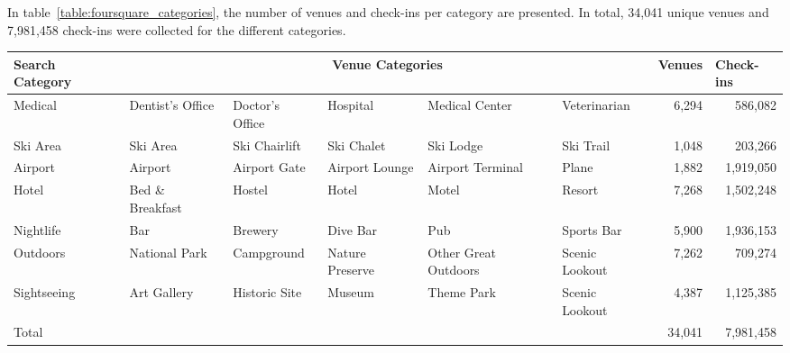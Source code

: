 In table~\ref{table:foursquare_categories}, the number of venues and check-ins per category are presented. In total, 34,041 unique venues and 7,981,458 check-ins were collected for the different categories.


\begin{sidewaystable}[]
\centering
\caption{foursquare venue categories}
\label{table:foursquare_categories}

\centering %

\begin{tabular}{lrrrrrrr}
\toprule
Search Category & \multicolumn{5}{c}{Venue Categories}  & \multicolumn{1}{l}{Venues} & \multicolumn{1}{l}{Check-ins} \\
\midrule
Medical & \multicolumn{1}{l}{Dentist's Office} & \multicolumn{1}{l}{Doctor's Office} & \multicolumn{1}{l}{Hospital} & \multicolumn{1}{l}{Medical Center} & \multicolumn{1}{l}{Veterinarian} &          6,294  &              586,082  \\
Ski Area & \multicolumn{1}{l}{Ski Area} & \multicolumn{1}{l}{Ski Chairlift} & \multicolumn{1}{l}{Ski Chalet} & \multicolumn{1}{l}{Ski Lodge} & \multicolumn{1}{l}{Ski Trail} &          1,048  &              203,266  \\
Airport & \multicolumn{1}{l}{Airport} & \multicolumn{1}{l}{Airport Gate} & \multicolumn{1}{l}{Airport Lounge} & \multicolumn{1}{l}{Airport Terminal} & \multicolumn{1}{l}{Plane} &          1,882  &          1,919,050  \\
Hotel & \multicolumn{1}{l}{Bed \& Breakfast} & \multicolumn{1}{l}{Hostel} & \multicolumn{1}{l}{Hotel} & \multicolumn{1}{l}{Motel} & \multicolumn{1}{l}{Resort} &          7,268  &          1,502,248  \\
Nightlife & \multicolumn{1}{l}{Bar} & \multicolumn{1}{l}{Brewery} & \multicolumn{1}{l}{Dive Bar} & \multicolumn{1}{l}{Pub} & \multicolumn{1}{l}{Sports Bar} &          5,900  &          1,936,153  \\
Outdoors & \multicolumn{1}{l}{National Park} & \multicolumn{1}{l}{Campground} & \multicolumn{1}{l}{Nature Preserve} & \multicolumn{1}{l}{Other Great Outdoors} & \multicolumn{1}{l}{Scenic Lookout} &          7,262  &              709,274  \\
Sightseeing & \multicolumn{1}{l}{Art Gallery} & \multicolumn{1}{l}{Historic Site} & \multicolumn{1}{l}{Museum} & \multicolumn{1}{l}{Theme Park} & \multicolumn{1}{l}{Scenic Lookout} &          4,387  &          1,125,385  \\
\midrule
Total &       &       &       &       &       &       34,041  &          7,981,458  \\
\end{tabular}%

\end{sidewaystable}

